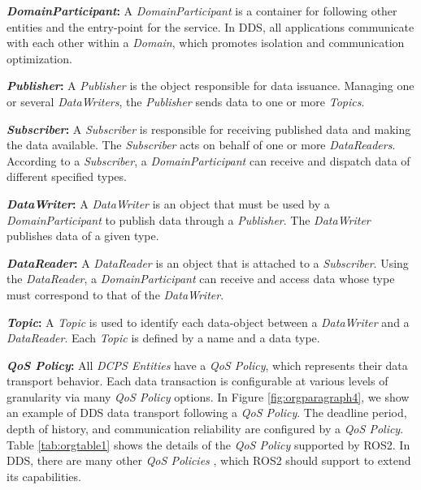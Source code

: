 \documentclass{sig-alternate-05-2015}
\begin{document}
\noindent \textbf{\emph{DomainParticipant}:} 
A \emph{DomainParticipant} is a container for following other entities and the entry-point for the service. 
In DDS, all applications communicate with each other within a \emph{Domain}, which promotes isolation and communication optimization.

\noindent \textbf{\emph{Publisher}:} 
A \emph{Publisher} is the object responsible for data issuance. 
Managing one or several \emph{DataWriters}, the \emph{Publisher} sends data to one or more \emph{Topics}.

\noindent \textbf{\emph{Subscriber}:} 
A \emph{Subscriber} is responsible for receiving published data and making the data available. 
The \emph{Subscriber} acts on behalf of one or more \emph{DataReaders}. 
According to a \emph{Subscriber}, a \emph{DomainParticipant} can receive and dispatch data of different specified types.

\noindent \textbf{\emph{DataWriter}:} 
A \emph{DataWriter} is an object that must be used by a \emph{DomainParticipant} to publish data through a \emph{Publisher}. 
The \emph{DataWriter} publishes data of a given type.

\noindent \textbf{\emph{DataReader}:} 
A \emph{DataReader} is an object that is attached to a \emph{Subscriber}. 
Using the \emph{DataReader}, a \emph{DomainParticipant} can receive and access data whose type must correspond to that of the \emph{DataWriter}.

\noindent \textbf{\emph{Topic}:} 
A \emph{Topic} is used to identify each data-object between a \emph{DataWriter} and a  \emph{DataReader}. 
Each \emph{Topic} is defined by a name and a data type. 

\noindent \textbf{\emph{QoS Policy}:} 
All \emph{DCPS Entities} have a \emph{QoS Policy}, which represents their data transport behavior. 
Each data transaction is configurable at various levels of granularity via many \emph{QoS Policy} options. 
In Figure \ref{fig:orgparagraph4}, we show an example of DDS data transport following a \emph{QoS Policy}. 
The deadline period, depth of history, and communication reliability are configured by a \emph{QoS Policy}. 
Table \ref{tab:orgtable1} shows the details of the \emph{QoS Policy} supported by ROS2. 
In DDS, there are many other \emph{QoS Policies} \cite{dds1.4}, which ROS2 should support to extend its capabilities.
\end{document}
